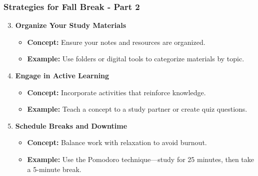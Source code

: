 \documentclass[aspectratio=169]{beamer}
\begin{document}
\begin{frame}[fragile]
    \frametitle{Strategies for Fall Break - Part 2}
    \begin{enumerate}
        \setcounter{enumi}{2}
        \item \textbf{Organize Your Study Materials}
            \begin{itemize}
                \item \textbf{Concept:} Ensure your notes and resources are organized.
                \item \textbf{Example:} Use folders or digital tools to categorize materials by topic.
            \end{itemize}

        \item \textbf{Engage in Active Learning}
            \begin{itemize}
                \item \textbf{Concept:} Incorporate activities that reinforce knowledge.
                \item \textbf{Example:} Teach a concept to a study partner or create quiz questions.
            \end{itemize}

        \item \textbf{Schedule Breaks and Downtime}
            \begin{itemize}
                \item \textbf{Concept:} Balance work with relaxation to avoid burnout.
                \item \textbf{Example:} Use the Pomodoro technique—study for 25 minutes, then take a 5-minute break.
            \end{itemize}
    \end{enumerate}
\end{frame}
\end{document}
